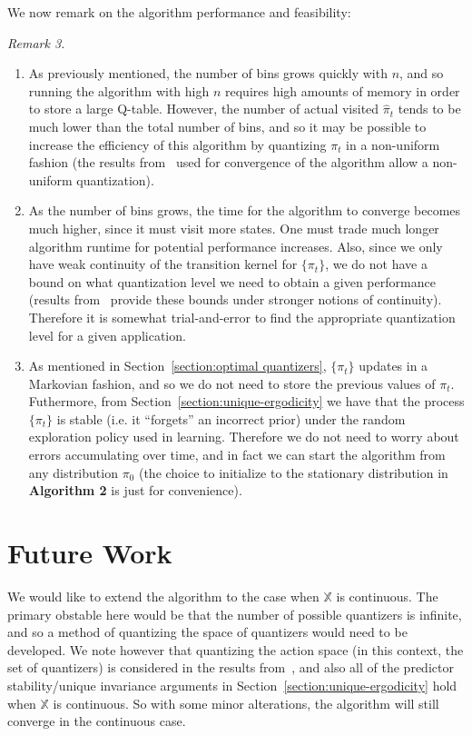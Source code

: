 \documentclass[conference, draftcls, onecolumn]{IEEEtran}
\begin{document}
\noindent We now remark on the algorithm performance and feasibility:

\vspace{1em}
\noindent\emph{Remark 3.}\label{remark:3}
\begin{enumerate}
    \item As previously mentioned, the number of bins grows quickly with \(n\), and so running the algorithm with high \(n\) requires high amounts of memory in order to store a large Q-table. However, the number of actual visited \(\hat{\pi}_t\) tends to be much lower than the total number of bins, and so it may be possible to increase the efficiency of this algorithm by quantizing \( \pi_t \) in a non-uniform fashion (the results from~\cite{Kara} used for convergence of the algorithm allow a non-uniform quantization).
    \item As the number of bins grows, the time for the algorithm to converge becomes much higher, since it must visit more states. One must trade much longer algorithm runtime for potential performance increases. Also, since  we only have weak continuity of the transition kernel for \(\{\pi_t\}\), we do not have a bound on what quantization level we need to obtain a given performance (results from~\cite{Kara} provide these bounds under stronger notions of continuity). Therefore it is somewhat trial-and-error to find the appropriate quantization level for a given application.
    \item As mentioned in Section~\ref{section:optimal quantizers}, \(\{\pi_t\}\) updates in a Markovian fashion, and so we do not need to store the previous values of \(\pi_t\). Futhermore, from Section~\ref{section:unique-ergodicity} we have that the process \(\{\pi_t\}\) is stable (i.e. it ``forgets'' an incorrect prior) under the random exploration policy used in learning. Therefore we do not need to worry about errors accumulating over time, and in fact we can start the algorithm from any distribution \(\pi_0\) (the choice to initialize to the stationary distribution in \textbf{Algorithm 2} is just for convenience).
\end{enumerate}

\section{Future Work}
We would like to extend the algorithm to the case when \( \mathbb{X} \) is continuous. The primary obstable here would be that the number of possible quantizers is infinite, and so a method of quantizing the space of quantizers would need to be developed. We note however that quantizing the action space (in this context, the set of quantizers) is considered in the results from~\cite{Kara}, and also all of the predictor stability/unique invariance arguments in Section~\ref{section:unique-ergodicity} hold when \( \mathbb{X} \) is continuous. So with some minor alterations, the algorithm will still converge in the continuous case.
\end{document}
